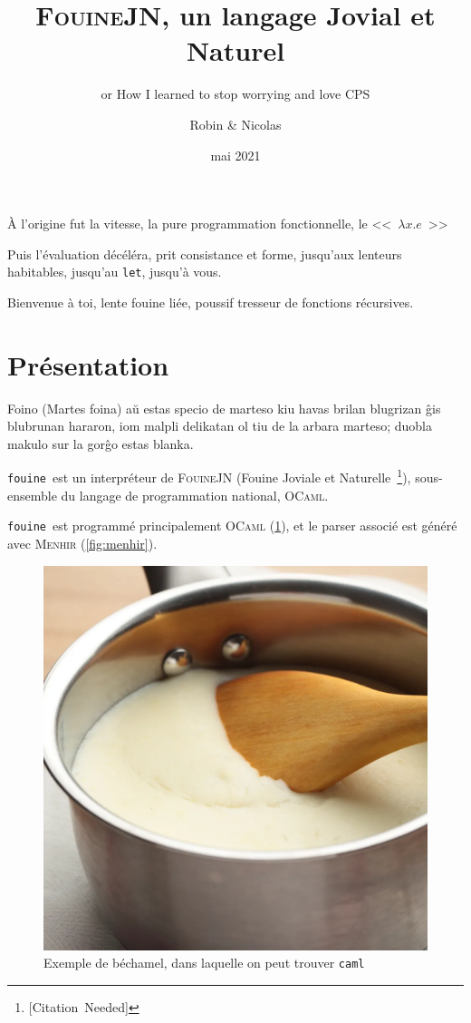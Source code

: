 \documentclass[a4, 12pt, titlepage]{scrartcl}
\title{\textsc{FouineJN}, un langage Jovial et Naturel}
\subtitle{or How I learned to stop worrying and love CPS}
\author{Robin \bsc{Jourde} \& Nicolas \bsc{Nardino}}
\date{mai 2021}
\newcommand{\fouine}[0]{\texttt{fouine}}
\begin{document}
\maketitle

\begin{center}
  \small
  
\end{center}

\newpage

\epigraph{
À l'origine fut la vitesse, la pure programmation fonctionnelle, le
<<~$\lambda x.e$~>>

Puis l'évaluation décéléra, prit consistance et forme, jusqu'aux lenteurs
habitables, jusqu'au \texttt{let}, jusqu'à vous.

Bienvenue à toi, lente fouine liée, poussif tresseur de fonctions
récursives.}{\cite{LaHorde}}




\tableofcontents

\section{Présentation}\label{sec:1}

Foino (Martes foina) aŭ estas specio de marteso kiu havas brilan
blugrizan ĝis blubrunan hararon, iom malpli delikatan ol tiu de la
arbara marteso; duobla makulo sur la gorĝo estas blanka.~\cite{wiki:001}

\fouine\ est un interpréteur de \textsc{FouineJN} (Fouine
Joviale et Naturelle~\footnote{[Citation~Needed]}), sous-ensemble du
langage de programmation national, \textsc{OCaml}.

\fouine\ est programmé principalement \textsc{OCaml} (\ref{fig:ocaml}),
et le parser associé est généré avec \textsc{Menhir} (\ref{fig:menhir}).

\begin{figure}[H]
  \centering
  \includegraphics[width=0.33\linewidth]{figures/bechamel.png}
  \caption{\label{fig:ocaml} Exemple de béchamel, dans laquelle on
    peut trouver \texttt{caml}}
\end{figure}
\end{document}
